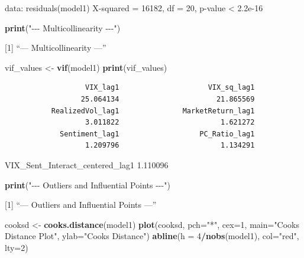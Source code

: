 \documentclass[
]{article}
\newenvironment{Shaded}{\begin{snugshade}}{\end{snugshade}}
\newcommand{\AttributeTok}[1]{\textcolor[rgb]{0.13,0.29,0.53}{#1}}
\newcommand{\DecValTok}[1]{\textcolor[rgb]{0.00,0.00,0.81}{#1}}
\newcommand{\FunctionTok}[1]{\textcolor[rgb]{0.13,0.29,0.53}{\textbf{#1}}}
\newcommand{\NormalTok}[1]{#1}
\newcommand{\OtherTok}[1]{\textcolor[rgb]{0.56,0.35,0.01}{#1}}
\newcommand{\SpecialCharTok}[1]{\textcolor[rgb]{0.81,0.36,0.00}{\textbf{#1}}}
\newcommand{\StringTok}[1]{\textcolor[rgb]{0.31,0.60,0.02}{#1}}
\begin{document}
data: residuals(model1) X-squared = 16182, df = 20, p-value \textless{}
2.2e-16

\begin{Shaded}
\begin{Highlighting}[]
  \FunctionTok{print}\NormalTok{(}\StringTok{"{-}{-}{-} Multicollinearity {-}{-}{-}"}\NormalTok{)}
\end{Highlighting}
\end{Shaded}

{[}1{]} ``--- Multicollinearity ---''

\begin{Shaded}
\begin{Highlighting}[]
\NormalTok{  vif\_values }\OtherTok{\textless{}{-}} \FunctionTok{vif}\NormalTok{(model1)}
  \FunctionTok{print}\NormalTok{(vif\_values)}
\end{Highlighting}
\end{Shaded}

\begin{verbatim}
                   VIX_lag1                     VIX_sq_lag1 
                  25.064134                       21.865569 
           RealizedVol_lag1               MarketReturn_lag1 
                   3.011822                        1.621272 
             Sentiment_lag1                   PC_Ratio_lag1 
                   1.209796                        1.134291 
\end{verbatim}

VIX\_Sent\_Interact\_centered\_lag1 1.110096

\begin{Shaded}
\begin{Highlighting}[]
  \FunctionTok{print}\NormalTok{(}\StringTok{"{-}{-}{-} Outliers and Influential Points {-}{-}{-}"}\NormalTok{)}
\end{Highlighting}
\end{Shaded}

{[}1{]} ``--- Outliers and Influential Points ---''

\begin{Shaded}
\begin{Highlighting}[]
\NormalTok{  cooksd }\OtherTok{\textless{}{-}} \FunctionTok{cooks.distance}\NormalTok{(model1)}
  \FunctionTok{plot}\NormalTok{(cooksd, }\AttributeTok{pch=}\StringTok{"*"}\NormalTok{, }\AttributeTok{cex=}\DecValTok{1}\NormalTok{, }\AttributeTok{main=}\StringTok{"Cook\textquotesingle{}s Distance Plot"}\NormalTok{, }\AttributeTok{ylab=}\StringTok{"Cook\textquotesingle{}s Distance"}\NormalTok{)}
  \FunctionTok{abline}\NormalTok{(}\AttributeTok{h =} \DecValTok{4}\SpecialCharTok{/}\FunctionTok{nobs}\NormalTok{(model1), }\AttributeTok{col=}\StringTok{"red"}\NormalTok{, }\AttributeTok{lty=}\DecValTok{2}\NormalTok{)}
\end{Highlighting}
\end{Shaded}
\end{document}

